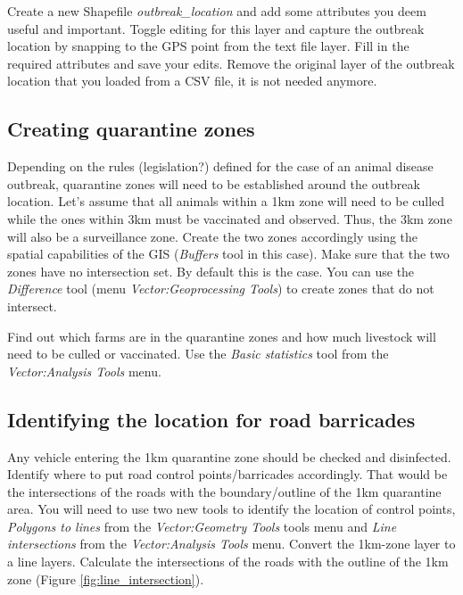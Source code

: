 \documentclass[a4paper,12pt,titlepage]{article}
\begin{document}
Create a new Shapefile \textit{outbreak\_location} and add some attributes you deem useful and important. Toggle editing for this layer and capture the outbreak location by snapping to the GPS point from the text file layer. Fill in the required attributes and save your edits. Remove the original layer of the outbreak location that you loaded from a CSV file, it is not needed anymore.

\subsection{Creating quarantine zones}
Depending on the rules (legislation?) defined for the case of an animal disease outbreak, quarantine zones will need to be established around the outbreak location. Let's assume that all animals within a 1km zone will need to be culled while the ones within 3km must be vaccinated and observed. Thus, the 3km zone will also be a surveillance zone. Create the two zones accordingly using the spatial capabilities of the GIS (\textit{Buffers} tool in this case). Make sure that the two zones have no intersection set. By default this is the case. You can use the \textit{Difference} tool (menu \textit{Vector:Geoprocessing Tools}) to create zones that do not intersect.

Find out which farms are in the quarantine zones and how much livestock will need to be culled or vaccinated. Use the \textit{Basic statistics} tool from the \textit{Vector:Analysis Tools} menu.

\subsection{Identifying the location for road barricades}
Any vehicle entering the 1km quarantine zone should be checked and disinfected. Identify where to put road control points/barricades accordingly. That would be the intersections of the roads with the boundary/outline of the 1km quarantine area. You will need to use two new tools to identify the location of control points, \textit{Polygons to lines} from the \textit{Vector:Geometry Tools} tools menu and \textit{Line intersections} from the \textit{Vector:Analysis Tools} menu. Convert the 1km-zone layer to a line layers. Calculate the intersections of the roads with the outline of the 1km zone (Figure \ref{fig:line_intersection}).
\end{document}
